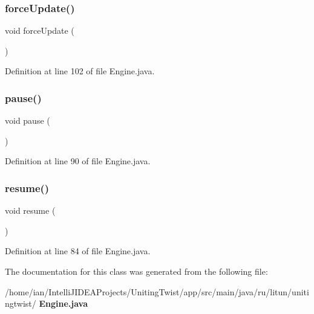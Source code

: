 \mbox{\label{classru_1_1litun_1_1unitingtwist_1_1_engine_a9b17fb9e1ca3c4f937cddc62c84770c2}} 
\subsubsection{force\+Update()}
{\footnotesize\ttfamily void force\+Update (\begin{DoxyParamCaption}{ }\end{DoxyParamCaption})}



Definition at line 102 of file Engine.\+java.

\mbox{\label{classru_1_1litun_1_1unitingtwist_1_1_engine_a7167f5c196fc5e167bfabde1a730e81d}} 
\subsubsection{pause()}
{\footnotesize\ttfamily void pause (\begin{DoxyParamCaption}{ }\end{DoxyParamCaption})}



Definition at line 90 of file Engine.\+java.

\mbox{\label{classru_1_1litun_1_1unitingtwist_1_1_engine_a41de8150eff044a237990c271d57ea27}} 
\subsubsection{resume()}
{\footnotesize\ttfamily void resume (\begin{DoxyParamCaption}{ }\end{DoxyParamCaption})}



Definition at line 84 of file Engine.\+java.



The documentation for this class was generated from the following file\+:\begin{DoxyCompactItemize}
\item 
/home/ian/\+Intelli\+J\+I\+D\+E\+A\+Projects/\+Uniting\+Twist/app/src/main/java/ru/litun/unitingtwist/\textbf{ Engine.\+java}\end{DoxyCompactItemize}
